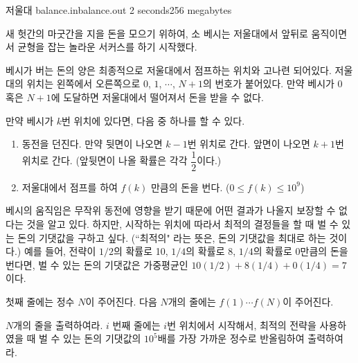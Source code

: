 \begin{problem}{저울대}
	{balance.in}{balance.out}
	{2 seconds}{256 megabytes}{}
	
	
	새 헛간의 마굿간을 지을 돈을 모으기 위하여, 소 베시는 저울대에서 앞뒤로 움직이면서 균형을 잡는 놀라운 서커스를 하기 시작했다.

	베시가 버는 돈의 양은 최종적으로 저울대에서 점프하는 위치와 고나련 되어있다. 저울대의 위치는 왼쪽에서 오른쪽으로 $0$, $1$, $\cdots$, $N+1$의 번호가 붙어있다. 만약 베시가 $0$ 혹은 $N+1$에 도달하면 저울대에서 떨어져서 돈을 받을 수 없다.

	만약 베시가 $k$번 위치에 있다면, 다음 중 하나를 할 수 있다.

	\begin{enumerate}
		\item 동전을 던진다. 만약 뒷면이 나오면 $k-1$번 위치로 간다. 앞면이 나오면 $k+1$번 위치로 간다. (앞뒷면이 나올 확률은 각각 $\dfrac{1}{2}$이다.)
		\item 저울대에서 점프를 하여 $f(k)$ 만큼의 돈을 번다. ($0 \le f(k) \le 10^9$)
	\end{enumerate}
	
	베시의 움직임은 무작위 동전에 영향을 받기 때문에 어떤 결과가 나올지 보장할 수 없다는 것을 알고 있다. 하지만, 시작하는 위치에 따라서 최적의 결정들을 할 때 벌 수 있는 돈의 기댓값을 구하고 싶다. (``최적의" 라는 뜻은, 돈의 기댓값을 최대로 하는 것이다.) 예를 들어, 전략이 $1/2$의 확률로 10, $1/4$의 확률로 8, $1/4$의 확률로 0만큼의 돈을 번다면, 벌 수 있는 돈의 기댓값은 가중평균인 $10(1/2)+8(1/4)+0(1/4)=7$이다.

	
	\InputFile
	
	첫째 줄에는 정수 $N$이 주어진다. 다음 $N$개의 줄에는 $f(1) \cdots f(N)$이 주어진다.
	
	\OutputFile
	
	$N$개의 줄을 출력하여라. $i$ 번째 줄에는 $i$번 위치에서 시작해서, 최적의 전략을 사용하였을 때 벌 수 있는 돈의 기댓값의 $10^5$배를 가장 가까운 정수로 반올림하여 출력하여라.

	\Examples
	
	\begin{example}
	\end{example}

	
\end{problem}

